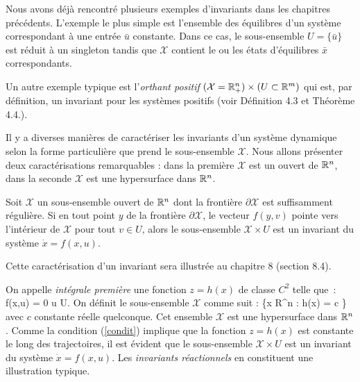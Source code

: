 Nous avons d\'ej\`a rencontr\'e plusieurs exemples d'invariants dans les chapitres
pr\'ec\'edents.  L'exemple le plus simple est l'ensemble des \'equilibres d'un
syst\`eme correspondant \`a une entr\'ee $\bar u$ constante.  Dans ce cas, le
sous-ensemble $U = \{\bar u\}$  est r\'eduit \`a un singleton tandis que $\mathcal{X}$
contient le ou les \'etats d'\'equilibres $\bar x$ correspondants.  

Un autre exemple typique est l'{\em orthant positif} $(\mathcal{X} = \mathbb{R}^n_+) \times (U \subset \mathbb{R}^m)$ 
qui est, par d\'efinition, un invariant pour les syst\`emes positifs
(voir D\'efinition 4.3 et Th\'eor\`eme 4.4.).

Il y a diverses mani\`eres de caract\'eriser les invariants d'un syst\`eme
dynamique selon la forme particuli\`ere que prend le sous-ensemble $\mathcal{X}$.  Nous
allons pr\'esenter deux caract\'erisations remarquables : dans la premi\`ere $\mathcal{X}$
est un ouvert de $\mathbb{R}^n$, dans la seconde $\mathcal{X}$ est une
hypersurface dans $\mathbb{R}^n$.  \\


Soit $\mathcal{X}$ un sous-ensemble ouvert de  $\mathbb{R}^n$ dont la fronti\`ere $\partial \mathcal{X}$ est suffisamment régulière.  Si en tout
point $y$ de la fronti\`ere $\partial \mathcal{X}$, le vecteur $f(y,v)$ pointe vers
l'int\'erieur de $\mathcal{X}$ pour tout $v \in U$, alors le sous-ensemble $\mathcal{X} \times U$
est un invariant du syst\`eme $\dot x = f(x,u)$.

Cette caract\'erisation d'un invariant sera illustr\'ee au chapitre 8 (section 8.4).\\


On appelle {\it int\'egrale premi\`ere} une fonction $z = h(x)$ de classe $C^2$ telle que~:
\eqn
{}f(x,u) = 0 \;\;\; \forall u \in U. \label{condit}
\eeqn
On d\'efinit le sous-ensemble $\mathcal{X}$ comme suit :
\eqnn
{} \triangleq \{x \in R^n : h(x) = c \}
\eeqnn
avec $c$ constante r\'eelle quelconque.
Cet ensemble $\mathcal{X}$ est une hypersurface dans $\mathbb{R}^n$.  Comme la condition (\ref{condit}) implique que la fonction $z = h(x)$ est constante le long des trajectoires, il est \'evident que le sous-ensemble
$\mathcal{X} \times U$ est un invariant du syst\`eme $\dot x = f(x,u)$.  Les
{\em invariants r\'eactionnels} en constituent une illustration typique. 

